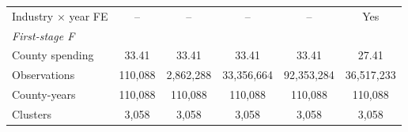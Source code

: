 \begin{tabular*}{\linewidth}{@{\extracolsep{\fill}}lccccc@{}}
Industry $\times$ year FE & -- & -- & -- & -- & Yes \\
\addlinespace[4pt]
\textit{First-stage F} &  &  &  &  &  \\
\hspace{1em}County spending & 33.41 & 33.41 & 33.41 & 33.41 & 27.41 \\
\addlinespace[7pt]
Observations & 110,088 & 2,862,288 & 33,356,664 & 92,353,284 & 36,517,233 \\
County-years & 110,088 & 110,088 & 110,088 & 110,088 & 110,088 \\
Clusters & 3,058 & 3,058 & 3,058 & 3,058 & 3,058 \\
\bottomrule\end{tabular*}
